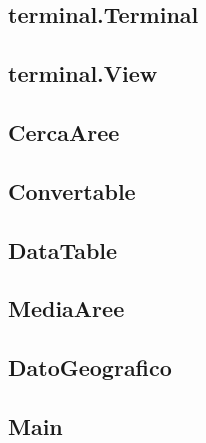 \documentclass[a4paper, 12pt,twoside]{article}
\begin{document}
			\subsection{terminal.Terminal}
			\subsection{terminal.View}
			
			\subsection{CercaAree}
			\subsection{Convertable}
			\subsection{DataTable}
			\subsection{MediaAree}
			\subsection{DatoGeografico}
		
		
		\subsection{Main}

	
	

		
	
	

	

	

	
	
	
	
	
\end{document}
